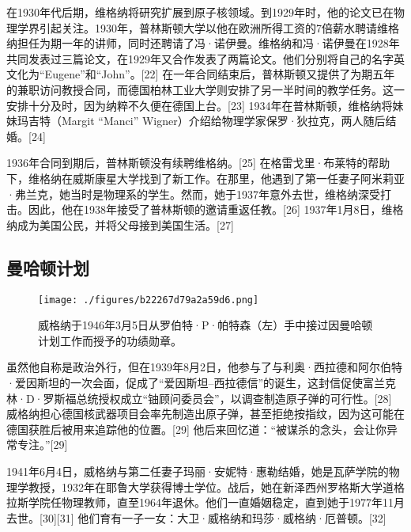 在1930年代后期，维格纳将研究扩展到原子核领域。到1929年时，他的论文已在物理学界引起关注。1930年，普林斯顿大学以他在欧洲所得工资的7倍薪水聘请维格纳担任为期一年的讲师，同时还聘请了冯·诺伊曼。维格纳和冯·诺伊曼在1928年共同发表过三篇论文，在1929年又合作发表了两篇论文。他们分别将自己的名字英文化为“Eugene”和“John”。[22] 在一年合同结束后，普林斯顿又提供了为期五年的兼职访问教授合同，而德国柏林工业大学则安排了另一半时间的教学任务。这一安排十分及时，因为纳粹不久便在德国上台。[23] 1934年在普林斯顿，维格纳将妹妹玛吉特（Margit “Manci” Wigner）介绍给物理学家保罗·狄拉克，两人随后结婚。[24]

1936年合同到期后，普林斯顿没有续聘维格纳。[25] 在格雷戈里·布莱特的帮助下，维格纳在威斯康星大学找到了新工作。在那里，他遇到了第一任妻子阿米莉亚·弗兰克，她当时是物理系的学生。然而，她于1937年意外去世，维格纳深受打击。因此，他在1938年接受了普林斯顿的邀请重返任教。[26] 1937年1月8日，维格纳成为美国公民，并将父母接到美国生活。[27]
\subsection{曼哈顿计划}
\begin{figure}[ht]
\centering
\texttt{[image: ./figures/b22267d79a2a59d6.png]}
\caption{威格纳于1946年3月5日从罗伯特·P·帕特森（左）手中接过因曼哈顿计划工作而授予的功绩勋章。} \label{fig_YJwgn_4}
\end{figure}
虽然他自称是政治外行，但在1939年8月2日，他参与了与利奥·西拉德和阿尔伯特·爱因斯坦的一次会面，促成了“爱因斯坦–西拉德信”的诞生，这封信促使富兰克林·D·罗斯福总统授权成立“铀顾问委员会”，以调查制造原子弹的可行性。[28] 威格纳担心德国核武器项目会率先制造出原子弹，甚至拒绝按指纹，因为这可能在德国获胜后被用来追踪他的位置。[29] 他后来回忆道：“被谋杀的念头，会让你异常专注。”[29]

1941年6月4日，威格纳与第二任妻子玛丽·安妮特·惠勒结婚，她是瓦萨学院的物理学教授，1932年在耶鲁大学获得博士学位。战后，她在新泽西州罗格斯大学道格拉斯学院任物理教师，直至1964年退休。他们一直婚姻稳定，直到她于1977年11月去世。[30][31] 他们育有一子一女：大卫·威格纳和玛莎·威格纳·厄普顿。[32]

